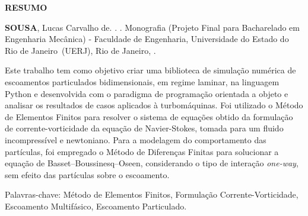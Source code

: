 \begin{center}
\textbf{RESUMO}
\end{center}

%
%

$\!$\\

\hspace{-1.3cm}\textbf{SOUSA}, Lucas Carvalho de. \textit{\mainTitle}. \numPages. Monografia (Projeto Final para Bacharelado em Engenharia Mecânica) - Faculdade de Engenharia, Universidade do Estado do Rio de Janeiro~(UERJ), Rio de Janeiro, \curYear.

\vspace{.2cm}

Este trabalho tem como objetivo criar uma biblioteca de simulação numérica de escoamentos particulados bidimensionais, em regime laminar, na linguagem Python e desenvolvida com o paradigma de programação orientada a objeto e analisar os resultados de casos aplicados à turbomáquinas.
Foi utilizado o Método de Elementos Finitos para resolver o sistema de equações obtido da formulação de corrente-vorticidade da equação de Navier-Stokes, tomada para um fluido incompressível e newtoniano.
Para a modelagem do comportamento das partículas, foi empregado o Método de Diferenças Finitas para solucionar a equação de Basset–Boussinesq–Oseen, considerando o tipo de interação \textit{one-way}, sem efeito das partículas sobre o escoamento.

\vspace{1cm}

\hspace{-1.3cm}Palavras-chave: Método de Elementos Finitos, Formulação Corrente-Vorticidade, Escoamento Multifásico, Escoamento Particulado.